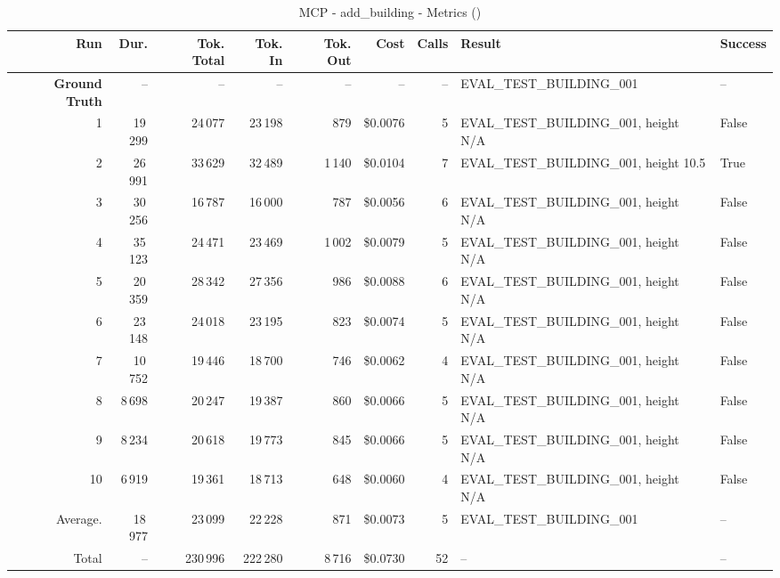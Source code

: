 \documentclass[a4paper,11pt]{article}
\begin{document}
\begin{table}[ht]
\centering
\scriptsize
\caption{MCP - add\_building - Metrics ()}
\label{tab:mcp\_add\_building\_metrics\_}
\begin{tabular}{r r r r r r r p{3cm} l}
\hline
Run & Dur. & Tok. Total & Tok. In & Tok. Out & Cost & Calls & Result & Success \\
\hline
\textbf{Ground Truth} & -- & -- & -- & -- & -- & -- & EVAL\_TEST\_BUILDING\_001 & -- \\
\hline
1 & 19\,299 & 24\,077 & 23\,198 & 879 & \$0.0076 & 5 & EVAL\_TEST\_BUILDING\_001, height N/A & False \\
2 & 26\,991 & 33\,629 & 32\,489 & 1\,140 & \$0.0104 & 7 & EVAL\_TEST\_BUILDING\_001, height 10.5 & True \\
3 & 30\,256 & 16\,787 & 16\,000 & 787 & \$0.0056 & 6 & EVAL\_TEST\_BUILDING\_001, height N/A & False \\
4 & 35\,123 & 24\,471 & 23\,469 & 1\,002 & \$0.0079 & 5 & EVAL\_TEST\_BUILDING\_001, height N/A & False \\
5 & 20\,359 & 28\,342 & 27\,356 & 986 & \$0.0088 & 6 & EVAL\_TEST\_BUILDING\_001, height N/A & False \\
6 & 23\,148 & 24\,018 & 23\,195 & 823 & \$0.0074 & 5 & EVAL\_TEST\_BUILDING\_001, height N/A & False \\
7 & 10\,752 & 19\,446 & 18\,700 & 746 & \$0.0062 & 4 & EVAL\_TEST\_BUILDING\_001, height N/A & False \\
8 & 8\,698 & 20\,247 & 19\,387 & 860 & \$0.0066 & 5 & EVAL\_TEST\_BUILDING\_001, height N/A & False \\
9 & 8\,234 & 20\,618 & 19\,773 & 845 & \$0.0066 & 5 & EVAL\_TEST\_BUILDING\_001, height N/A & False \\
10 & 6\,919 & 19\,361 & 18\,713 & 648 & \$0.0060 & 4 & EVAL\_TEST\_BUILDING\_001, height N/A & False \\
\hline
Average. & 18\,977 & 23\,099 & 22\,228 & 871 & \$0.0073 & 5 & EVAL\_TEST\_BUILDING\_001 & -- \\
Total & -- & 230\,996 & 222\,280 & 8\,716 & \$0.0730 & 52 & -- & -- \\
\hline
\end{tabular}
\end{table}

\clearpage
\end{document}

